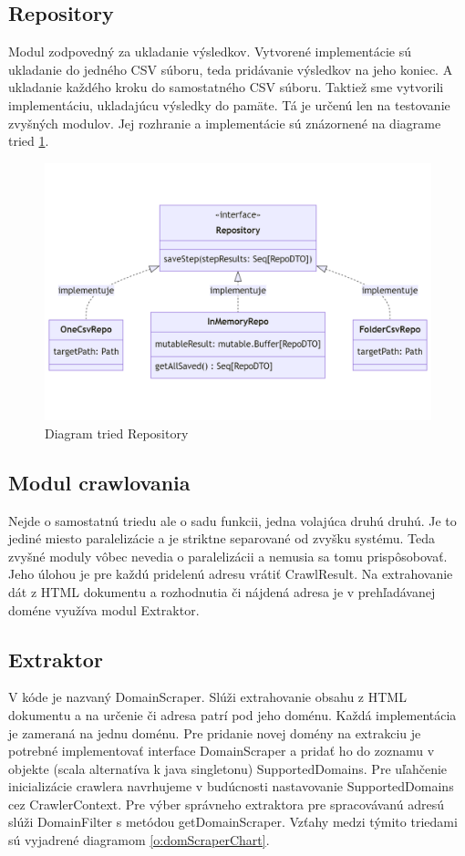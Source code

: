 \subsection{Repository}
Modul zodpovedný za ukladanie výsledkov. Vytvorené implementácie sú ukladanie do jedného CSV súboru, teda pridávanie výsledkov na jeho koniec. A ukladanie každého kroku do samostatného CSV súboru. Taktiež sme vytvorili implementáciu, ukladajúcu výsledky do pamäte. Tá je určenú len na testovanie zvyšných modulov. Jej rozhranie a implementácie sú znázornené na diagrame tried \ref{o:repoClassChart}. 

\begin{figure}[!ht]
    \centering
    \includegraphics[width=1\textwidth]{figures/repositoryClassChart.png}
    \caption{Diagram tried Repository\label{o:repoClassChart}}
\end{figure}

\subsection{Modul crawlovania}
Nejde o samostatnú triedu ale o sadu funkcii, jedna volajúca druhú druhú. Je to jediné miesto paralelizácie a je striktne separované od zvyšku systému. Teda zvyšné moduly vôbec nevedia o paralelizácii a nemusia sa tomu prispôsobovať. Jeho úlohou je pre každú pridelenú adresu vrátiť CrawlResult. Na extrahovanie dát z HTML dokumentu a rozhodnutia či nájdená adresa je v prehľadávanej doméne využíva modul Extraktor.

\subsection{Extraktor}
V kóde je nazvaný DomainScraper. Slúži extrahovanie obsahu z HTML dokumentu a na určenie či adresa patrí pod jeho doménu. Každá implementácia je zameraná na jednu doménu. Pre pridanie novej domény na extrakciu je potrebné implementovať interface DomainScraper a pridať ho do zoznamu v objekte (scala alternatíva k java singletonu) SupportedDomains. Pre uľahčenie inicializácie crawlera navrhujeme v budúcnosti nastavovanie SupportedDomains cez CrawlerContext. Pre výber správneho extraktora pre spracovávanú adresú slúži DomainFilter s metódou getDomainScraper. Vzťahy medzi týmito triedami sú vyjadrené diagramom \ref{o:domScraperChart}.

